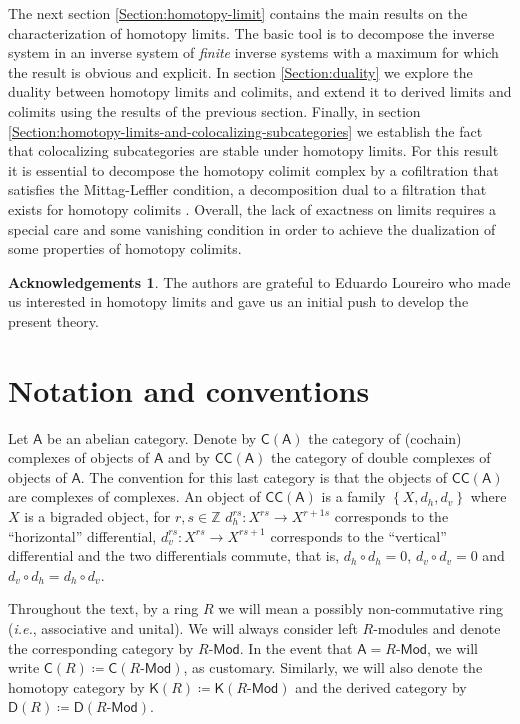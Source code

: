 \documentclass[reqno,11pt]{amsart}
\theoremstyle{plain}
\theoremstyle{remark}
\theoremstyle{definition}
\newtheorem*{ack}{Acknowledgements}
\numberwithin{equation}{thm}
\newcommand{\SA}{\mathsf{A}}
\newcommand{\CCC}{\boldsymbol{\mathsf{C}}}
\newcommand{\D}{\boldsymbol{\mathsf{D}}}
\newcommand{\K}{\boldsymbol{\mathsf{K}}}
\newcommand{\ZZ}{\mathbb{Z}}
\newcommand{\md}{\text{-}\mathsf{Mod}}
\begin{document}
The next section \ref{Section:homotopy-limit} contains the main results on the characterization of homotopy limits. The basic tool is to decompose the inverse system in an inverse system of \emph{finite} inverse systems with a maximum for which the result is obvious and explicit. In section \ref{Section:duality} we explore the duality between homotopy limits and colimits, and extend it to derived limits and colimits using the results of the previous section. Finally, in section \ref{Section:homotopy-limits-and-colocalizing-subcategories} we establish the fact that colocalizing subcategories are stable under homotopy limits. For this result it is essential to decompose the homotopy colimit complex by a cofiltration that satisfies the Mittag-Leffler condition, a decomposition dual to a filtration that exists for homotopy colimits \cite[Lemma 3.2]{AJS}. Overall, the lack of exactness on limits requires a special care and some vanishing condition in order to achieve the dualization of some properties of homotopy colimits.


\begin{ack}
The authors are grateful to Eduardo Loureiro who made us interested in homotopy limits and gave us an initial push to develop the present theory. 
\end{ack}
	
\section{Notation and conventions}\label{Section:Conventions}
	Let $\SA$ be an abelian category. Denote by $\CCC(\SA)$ the category of (cochain) complexes of objects of $\SA$ and by $\CCC\CCC(\SA)$ the category of double complexes of objects of $\SA$. The convention for this last category is that the objects of $\CCC\CCC(\SA)$ are complexes of complexes. An object of $\CCC\CCC(\SA)$ is a family $\left\{X, d_h, d_v\right\}$ where $X$ is a bigraded object, for $r,s \in \ZZ$ $d_h^{rs} \colon X^{rs} \to X^{r+1 s}$ corresponds to the ``horizontal'' differential, $d_v^{rs} \colon X^{rs} \to X^{r s+1}$ corresponds to the ``vertical'' differential and the two differentials commute, that is, $d_h \circ d_h = 0$, $d_v \circ d_v = 0$ and $d_v \circ d_h = d_h \circ d_v$.
	
	Throughout the text, by a ring $R$ we will mean a possibly non-commutative ring (\textit{i.e.}, associative and unital). We will always consider left $R$-modules and denote the corresponding category by $R\md$. In the event that $\SA = R\md$, we will write $\CCC(R) \coloneqq \CCC(R\md)$, as customary. Similarly, we will also denote the homotopy category by $\K(R) \coloneqq \K(R\md)$ and the derived category by $\D(R) \coloneqq \D(R\md)$.
	
\end{document}
